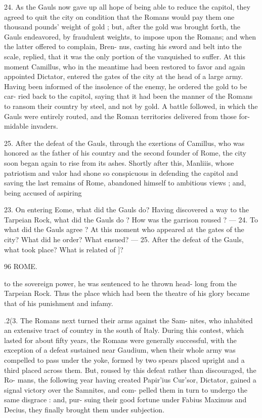 \documentclass[openany,a4paper]{memoir}
\begin{document}
24. As the Gauls now gave up all hope of being able to 
reduce the capitol, they agreed to quit the city on condition 
that the Romans would pay them one thousand pounds' 
weight of gold ; but, after the gold was brought forth, the 
Gauls endeavored, by fraudulent weights, to impose upon 
the Romans; and when the latter offered to complain, Bren- 
nus, casting his sword and belt into the scale, replied, that it 
was the only portion of the vanquished to suffer. At this 
moment Camillus, who in the meantime had been restored 
to favor and again appointed Dictator, entered the gates of 
the city at the head of a large army. Having been informed 
of the insolence of the enemy, he ordered the gold to be car- 
ried back to the capitol, saying that it had been the manner 
of the Romans to ransom their country by steel, and not by 
gold. A battle followed, in which the Gauls were entirely 
routed, and the Roman territories delivered from those for- 
midable invaders. 

25. After the defeat of the Gauls, through the exertions 
of Camillus, who was honored as the father of his country 
and the second founder of Rome, the city soon began again 
to rise from its ashes. Shortly after this, Manliiis, whose 
patriotism and valor had shone so conspicuous in defending 
the capitol and saving the last remains of Rome, abandoned 
himself to ambitious views ; and, being accused of aspiring 

23. On entering Eome, what did the Gauls do? Having discovered 
a way to the Tarpeian Rock, what did the Gauls do ? How was the 
garrison roused ? — 24. To what did the Gauls agree ? At this moment 
who appeared at the gates of the city? What did he order? What 
ensued? — 25. After the defeat of the Gauls, what took place? What 
is related of ]\Ianlius ? 



96 ROME. 

to the sovereign power, he was sentenced to he thrown head- 
long from the Tarpeian Rock. Thus the place which had 
been the theatre of his glory became that of his punishment 
and infamy. 

.2(3. The Romans next turned their arms against the Sam- 
nites, who inhabited an extensive tract of country in the 
south of Italy. During this contest, which lasted for about 
fifty years, the Romans were generally successful, with the 
exception of a defeat sustained near Gaudium, when their 
whole army was compelled to pass under the yoke, formed 
by two spears placed upright and a third placed across them. 
But, roused by this defeat rather than discouraged, the Ro- 
mans, the following year having created Papir'ius Cur'sor, 
Dictator, gained a signal victory over the Samnites, and com- 
pelled them in turn to undergo the same disgrace : and, pur- 
suing their good fortune under Fabius Maximus and Decius, 
they finally brought them under subjection. 
\end{document}

